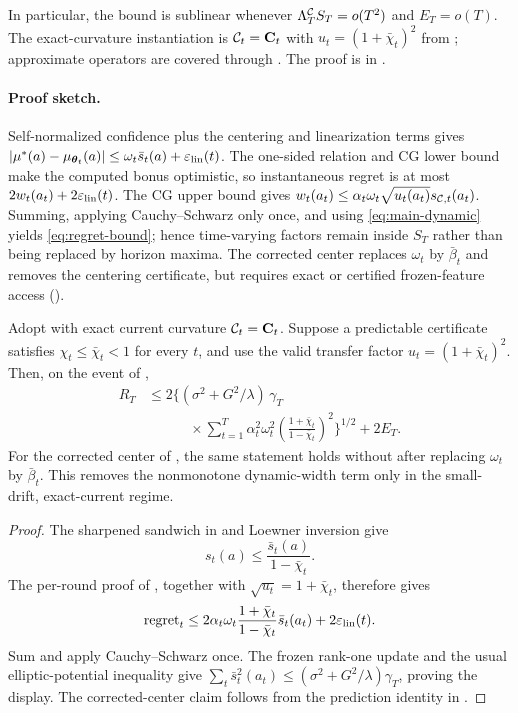 In particular, the bound is sublinear whenever
$\Lambda^{\mathcal{C}}_T S_T=o(T^2)$ and $E_T=o(T)$.
The exact-curvature instantiation is $\mathcal{C}_t=\mathbf{C}_t$ with
$u_t=(1+\bar\chi_t)^2$ from ; approximate operators are
covered through .  The proof is in
.

\paragraph{Proof sketch.}
Self-normalized confidence plus the centering and linearization terms gives
$|\mu^*(a)-\mu_{\boldsymbol{\theta}_t}(a)|\le\omega_t\bar s_t(a)+\varepsilon_{\mathrm{lin}}(t)$.
The one-sided relation and CG lower bound make the computed bonus optimistic,
so instantaneous regret is at most $2w_t(a_t)+2\varepsilon_{\mathrm{lin}}(t)$.  The CG upper
bound gives $w_t(a_t)\le\alpha_t\omega_t\sqrt{u_t(a_t)}s_{\mathcal{C},t}(a_t)$.
Summing, applying Cauchy--Schwarz only once, and using \eqref{eq:main-dynamic}
yields \eqref{eq:regret-bound}; hence time-varying factors remain inside $S_T$
rather than being replaced by horizon maxima.  The corrected center replaces
$\omega_t$ by $\bar\beta_t$ and removes the centering certificate, but requires
exact or certified frozen-feature access ().

\begin{corollary}
\label{cor:exact-current-frozen-potential}
Adopt  with exact current curvature $\mathcal{C}_t=\mathbf{C}_t$.
Suppose a predictable certificate satisfies
$\chi_t\le\bar\chi_t<1$ for every $t$, and use the valid transfer factor
$u_t=(1+\bar\chi_t)^2$.  Then, on the event of ,
\begin{equation}\label{eq:exact-current-frozen-potential}
\begin{aligned}
 R_T&\le 2\Biggl\{(\sigma^2+G^2/\lambda)\,\gamma_T\\[-1mm]
 &\qquad\quad\times\sum_{t=1}^T\alpha_t^2\omega_t^2
 \left(\frac{1+\bar\chi_t}{1-\bar\chi_t}\right)^2\Biggr\}^{1/2}
 +2E_T.
\end{aligned}
\end{equation}
For the corrected center of , the same statement
holds without  after replacing $\omega_t$ by $\bar\beta_t$.
This removes the nonmonotone dynamic-width term only in the small-drift,
exact-current regime.
\end{corollary}
\begin{proof}
The sharpened sandwich in  and Loewner inversion give
\[
 s_t(a)\le\frac{\bar s_t(a)}{1-\bar\chi_t}.
\]
The per-round proof of , together with
$\sqrt{u_t}=1+\bar\chi_t$, therefore gives
\[
 \operatorname{regret}_t\le
 2\alpha_t\omega_t
 \frac{1+\bar\chi_t}{1-\bar\chi_t}\bar s_t(a_t)
 +2\varepsilon_{\mathrm{lin}}(t).
\]
Sum and apply Cauchy--Schwarz once.  The frozen rank-one update and the usual
elliptic-potential inequality give
$\sum_t\bar s_t^2(a_t)\le
(\sigma^2+G^2/\lambda)\gamma_T$, proving the display.  The corrected-center
claim follows from the prediction identity in .
\end{proof}

